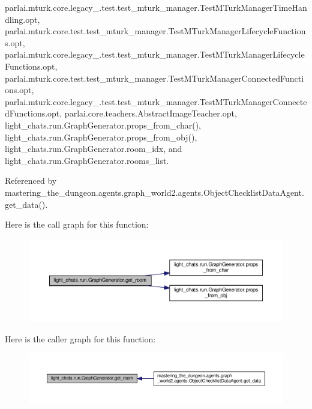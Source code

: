 parlai.\+mturk.\+core.\+legacy\+\_.\+test.\+test\+\_\+mturk\+\_\+manager.\+Test\+M\+Turk\+Manager\+Time\+Handling.\+opt, parlai.\+mturk.\+core.\+test.\+test\+\_\+mturk\+\_\+manager.\+Test\+M\+Turk\+Manager\+Lifecycle\+Functions.\+opt, parlai.\+mturk.\+core.\+legacy\+\_.\+test.\+test\+\_\+mturk\+\_\+manager.\+Test\+M\+Turk\+Manager\+Lifecycle\+Functions.\+opt, parlai.\+mturk.\+core.\+test.\+test\+\_\+mturk\+\_\+manager.\+Test\+M\+Turk\+Manager\+Connected\+Functions.\+opt, parlai.\+mturk.\+core.\+legacy\+\_.\+test.\+test\+\_\+mturk\+\_\+manager.\+Test\+M\+Turk\+Manager\+Connected\+Functions.\+opt, parlai.\+core.\+teachers.\+Abstract\+Image\+Teacher.\+opt, light\+\_\+chats.\+run.\+Graph\+Generator.\+props\+\_\+from\+\_\+char(), light\+\_\+chats.\+run.\+Graph\+Generator.\+props\+\_\+from\+\_\+obj(), light\+\_\+chats.\+run.\+Graph\+Generator.\+room\+\_\+idx, and light\+\_\+chats.\+run.\+Graph\+Generator.\+rooms\+\_\+list.



Referenced by mastering\+\_\+the\+\_\+dungeon.\+agents.\+graph\+\_\+world2.\+agents.\+Object\+Checklist\+Data\+Agent.\+get\+\_\+data().

Here is the call graph for this function\+:
\nopagebreak
\begin{figure}[H]
\begin{center}
\leavevmode
\includegraphics[width=350pt]{classlight__chats_1_1run_1_1GraphGenerator_aa59d2f6eb662add984d10f89d25ccab4_cgraph}
\end{center}
\end{figure}
Here is the caller graph for this function\+:
\nopagebreak
\begin{figure}[H]
\begin{center}
\leavevmode
\includegraphics[width=350pt]{classlight__chats_1_1run_1_1GraphGenerator_aa59d2f6eb662add984d10f89d25ccab4_icgraph}
\end{center}
\end{figure}
\mbox{\label{classlight__chats_1_1run_1_1GraphGenerator_a3b33b3e258b5d31a586a43b484bda91c}} 
